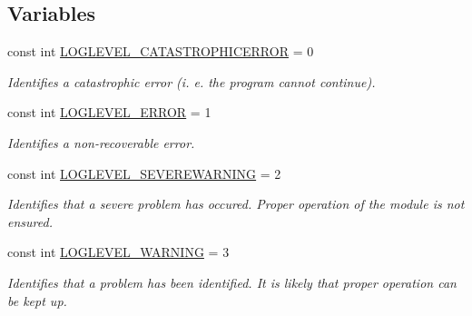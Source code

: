 \subsection*{Variables}
\begin{DoxyCompactItemize}
\item 
\mbox{\label{namespacelib_c_z_i_a67c1f1bc9ae5774830edaf5fb5ded0dc}} 
const int \hyperlink{namespacelib_c_z_i_a67c1f1bc9ae5774830edaf5fb5ded0dc}{L\+O\+G\+L\+E\+V\+E\+L\+\_\+\+C\+A\+T\+A\+S\+T\+R\+O\+P\+H\+I\+C\+E\+R\+R\+OR} = 0
\begin{DoxyCompactList}\small\item\em Identifies a catastrophic error (i. e. the program cannot continue). \end{DoxyCompactList}\item 
\mbox{\label{namespacelib_c_z_i_a2711fb740d09c5a9c88d125b3d984a02}} 
const int \hyperlink{namespacelib_c_z_i_a2711fb740d09c5a9c88d125b3d984a02}{L\+O\+G\+L\+E\+V\+E\+L\+\_\+\+E\+R\+R\+OR} = 1
\begin{DoxyCompactList}\small\item\em Identifies a non-\/recoverable error. \end{DoxyCompactList}\item 
\mbox{\label{namespacelib_c_z_i_af57d6c80bea4f0809cd8b4c9160c8fab}} 
const int \hyperlink{namespacelib_c_z_i_af57d6c80bea4f0809cd8b4c9160c8fab}{L\+O\+G\+L\+E\+V\+E\+L\+\_\+\+S\+E\+V\+E\+R\+E\+W\+A\+R\+N\+I\+NG} = 2
\begin{DoxyCompactList}\small\item\em Identifies that a severe problem has occured. Proper operation of the module is not ensured. \end{DoxyCompactList}\item 
\mbox{\label{namespacelib_c_z_i_a7e977f2d95127499f0f4e27b8a65d371}} 
const int \hyperlink{namespacelib_c_z_i_a7e977f2d95127499f0f4e27b8a65d371}{L\+O\+G\+L\+E\+V\+E\+L\+\_\+\+W\+A\+R\+N\+I\+NG} = 3
\begin{DoxyCompactList}\small\item\em Identifies that a problem has been identified. It is likely that proper operation can be kept up. \end{DoxyCompactList}\item 
\mbox{\label{namespacelib_c_z_i_a16bb83f2e19fe08cc4edd0a43a4331f0}} 

\end{DoxyCompactItemize}
